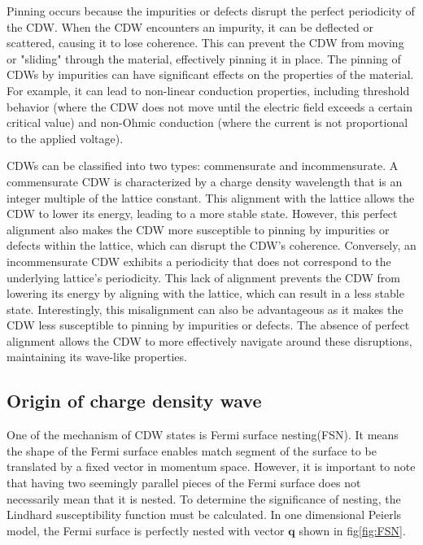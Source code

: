 Pinning occurs because the impurities or defects disrupt the perfect periodicity of the CDW. When the CDW encounters an impurity, it can be deflected or scattered, causing it to lose coherence. This can prevent the CDW from moving or "sliding" through the material, effectively pinning it in place. The pinning of CDWs by impurities can have significant effects on the properties of the material. For example, it can lead to non-linear conduction properties, including threshold behavior (where the CDW does not move until the electric field exceeds a certain critical value) and non-Ohmic conduction (where the current is not proportional to the applied voltage).\cite{fukuyama1978dynamics,lee1979electric}

CDWs can be classified into two types: commensurate and incommensurate. A commensurate CDW is characterized by a charge density wavelength that is an integer multiple of the lattice constant. This alignment with the lattice allows the CDW to lower its energy, leading to a more stable state. However, this perfect alignment also makes the CDW more susceptible to pinning by impurities or defects within the lattice, which can disrupt the CDW's coherence. Conversely, an incommensurate CDW exhibits a periodicity that does not correspond to the underlying lattice's periodicity. This lack of alignment prevents the CDW from lowering its energy by aligning with the lattice, which can result in a less stable state. Interestingly, this misalignment can also be advantageous as it makes the CDW less susceptible to pinning by impurities or defects. The absence of perfect alignment allows the CDW to more effectively navigate around these disruptions, maintaining its wave-like properties.
\subsection{Origin of charge density wave}

One of the mechanism of CDW states is Fermi surface nesting(FSN). It means the shape of the Fermi surface enables match segment of the surface to be translated by a fixed vector in momentum space.  However, it is important to note that having two seemingly parallel pieces of the Fermi surface does not necessarily mean that it is nested. To determine the significance of nesting, the Lindhard susceptibility function must be calculated\cite{lindhard1954properties}. In one dimensional Peierls model, the Fermi surface is perfectly nested with vector $\mathbf{q}$ shown in fig\ref{fig:FSN}.

